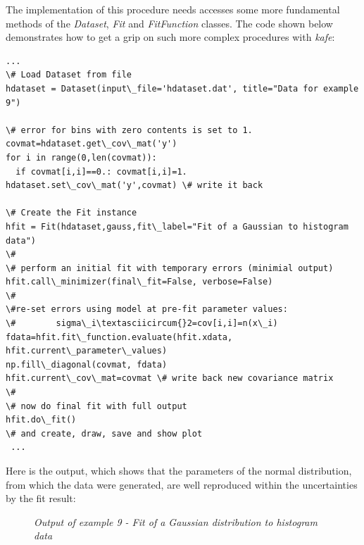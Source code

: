 \documentclass[a4paper,10pt,english]{sphinxmanual}
\begin{document}
The implementation of this  procedure needs accesses some
more fundamental methods of the \emph{Dataset}, \emph{Fit} and
\emph{FitFunction} classes. The code shown below demonstrates
how to get a grip on such more complex procedures with \emph{kafe}:

\begin{Verbatim}[commandchars=\\\{\}]
...
\# Load Dataset from file
hdataset = Dataset(input\_file='hdataset.dat', title="Data for example 9")

\# error for bins with zero contents is set to 1.
covmat=hdataset.get\_cov\_mat('y')
for i in range(0,len(covmat)):
  if covmat[i,i]==0.: covmat[i,i]=1.
hdataset.set\_cov\_mat('y',covmat) \# write it back

\# Create the Fit instance
hfit = Fit(hdataset,gauss,fit\_label="Fit of a Gaussian to histogram data")
\#
\# perform an initial fit with temporary errors (minimial output)
hfit.call\_minimizer(final\_fit=False, verbose=False)
\#
\#re-set errors using model at pre-fit parameter values:
\#        sigma\_i\textasciicircum{}2=cov[i,i]=n(x\_i)
fdata=hfit.fit\_function.evaluate(hfit.xdata, hfit.current\_parameter\_values)
np.fill\_diagonal(covmat, fdata)
hfit.current\_cov\_mat=covmat \# write back new covariance matrix
\#
\# now do final fit with full output
hfit.do\_fit()
\# and create, draw, save and show plot
 ...
\end{Verbatim}

Here is the output, which shows that the parameters of the
normal distribution, from which the data were generated, are
well reproduced within the uncertainties by the fit result:
\begin{figure}[htbp]
\centering
\capstart

\caption{\emph{Output of example 9 - Fit of a Gaussian distribution to histogram data}}\end{figure}
\end{document}
